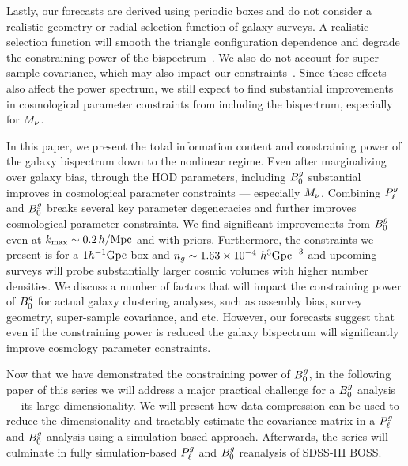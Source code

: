 Lastly, our forecasts are derived using periodic boxes and do not consider a
realistic geometry or radial selection function of galaxy surveys. A realistic 
selection function will smooth the triangle configuration dependence and degrade 
the constraining power of the bispectrum~\citep{sefusatti2005}. We also do not
account for super-sample covariance, which may also impact our
constraints~\citep{hamilton2006, sefusatti2006, takada2013, li2018, wadekar2019}. 
Since these effects also affect the power spectrum, we still expect to find
substantial improvements in cosmological parameter constraints from including
the bispectrum, especially for $M_\nu$. 

In this paper, we present the total information content and constraining power
of the galaxy bispectrum down to the nonlinear regime. Even after marginalizing
over galaxy bias, through the HOD parameters, including $B^g_0$ substantial
improves in cosmological parameter constraints --- especially $M_\nu$.
Combining $P^g_{\ell}$ and $B^g_0$ breaks several key parameter degeneracies
and further improves cosmological parameter constraints. We find significant
improvements from $B^g_0$ even at $k_{\rm max} \sim 0.2\,h/\mathrm{Mpc}$ and with \planck priors. 
Furthermore, the constraints we present is for a $1h^{-1}{\rm Gpc}$ 
box and $\bar{n}_g \sim 1.63\times 10^{-4}~h^3{\rm Gpc}^{-3}$ and upcoming surveys
will probe substantially larger cosmic volumes with higher number densities.
We discuss a number of factors that will impact the constraining power of $B^g_0$
for actual galaxy clustering analyses, such as assembly bias, survey geometry,
super-sample covariance, and etc. However, our forecasts suggest that even if
the constraining power is reduced the galaxy bispectrum will significantly improve
cosmology parameter constraints.

Now that we have demonstrated the constraining power of $B^g_0$, in the following 
paper of this series we will address a major practical challenge for a $B^g_0$
analysis --- its large dimensionality. We will present how data compression can
be used to reduce the dimensionality and tractably estimate the covariance
matrix in a $P^g_{\ell}$ and $B^g_0$ analysis using a simulation-based approach. Afterwards, 
the series will culminate in fully simulation-based $P^g_{\ell}$ and $B^g_0$
reanalysis of SDSS-III BOSS. 

